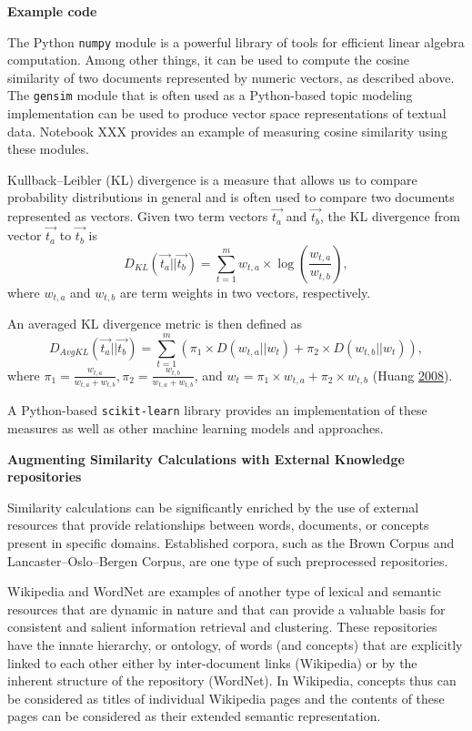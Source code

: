 \documentclass[]{krantz}
\begin{document}
\textbf{Example code}

The Python \texttt{numpy} module is a powerful library of tools for
efficient linear algebra computation. Among other things, it can be used
to compute the cosine similarity of two documents represented by numeric
vectors, as described above. The \texttt{gensim} module that is often
used as a Python-based topic modeling implementation can be used to
produce vector space representations of textual data. Notebook XXX
provides an example of measuring cosine similarity using these modules.

Kullback--Leibler (KL) divergence is a measure that allows us to compare
probability distributions in general and is often used to compare two
documents represented as vectors. Given two term vectors
\(\overrightarrow{t_a}\) and \(\overrightarrow{t_b}\), the KL divergence
from vector \(\overrightarrow{t_a}\) to \(\overrightarrow{t_b}\) is
\[D_{KL}(\overrightarrow{t_a}||\overrightarrow{t_b}) = \sum\limits_{t=1}^m w_{t,a}\times \log\left(\frac{w_{t,a}}{w_{t,b}}\right),\]
where \(w_{t,a}\) and \(w_{t,b}\) are term weights in two vectors,
respectively.

An averaged KL divergence metric is then defined as
\[D_{AvgKL}(\overrightarrow{t_a}||\overrightarrow{t_b}) = \sum\limits_{t=1}^m (\pi_1\times D(w_{t,a}||w_t)+\pi_2\times D(w_{t,b}||w_t)),\]
where
\(\pi_1 = \frac{w_{t,a}}{w_{t,a}+w_{t,b}}, \pi_2 = \frac{w_{t,b}}{w_{t,a}+w_{t,b}}\),
and \(w_t = \pi_1\times w_{t,a} + \pi_2\times w_{t,b}\) (Huang
\protect\hyperlink{ref-huang-08}{2008}).

A Python-based \texttt{scikit-learn} library provides an implementation
of these measures as well as other machine learning models and
approaches.

\textbf{Augmenting Similarity Calculations with External Knowledge
repositories}

Similarity calculations can be significantly enriched by the use of
external resources that provide relationships between words, documents,
or concepts present in specific domains. Established corpora, such as
the Brown Corpus and Lancaster--Oslo--Bergen Corpus, are one type of
such preprocessed repositories.

Wikipedia and WordNet are examples of another type of lexical and
semantic resources that are dynamic in nature and that can provide a
valuable basis for consistent and salient information retrieval and
clustering. These repositories have the innate hierarchy, or ontology,
of words (and concepts) that are explicitly linked to each other either
by inter-document links (Wikipedia) or by the inherent structure of the
repository (WordNet). In Wikipedia, concepts thus can be considered as
titles of individual Wikipedia pages and the contents of these pages can
be considered as their extended semantic representation.
\end{document}
